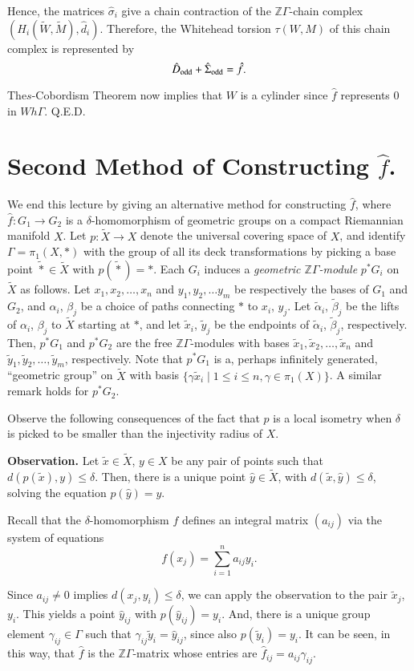 Hence, the matrices $\hat{\sigma}_i$ give a chain contraction of the
$\mathbb{Z} \Gamma$-chain complex $(H_i (\tilde{W}, \tilde{M}),
\hat{d}_i)$. Therefore, the Whitehead torsion $\tau (W, M)$ of this
chain complex is represented by 
$$
\hat{D}_{\operatorname{odd}} + \hat{\Sigma}_{\operatorname{odd}}= \hat{f}.
$$

The\pageoriginale $s$-Cobordism Theorem now implies that $W$ is a cylinder since
$\hat{f}$ represents 0 in $Wh \Gamma$. \hfill Q.E.D.

\setcounter{section}{2}
\section{Second Method of Constructing $\hat{f}$.}\label{c11:sec11.3}

We end this lecture by giving an alternative method for constructing
$\hat{f}$, where $\hat{f} : G_1 \to G_2$ is a $\delta$-homomorphism of
geometric groups on a compact Riemannian manifold $X$. Let $p:
\tilde{X} \to X$ denote the universal covering space of $X$, and
identify $\Gamma= \pi_1 (X, *)$ with the group of all its deck
transformations by picking a base point $\tilde{*} \in \tilde{X}$ with
$p (\tilde{*})= *$. Each $G_i$ induces a \textit{geometric $\mathbb{Z}
  \Gamma$-module} $p^* G_i$ on $\tilde{X}$ as follows. Let $x_1, x_2,
\ldots, x_n$ and $y_1, y_2, \ldots y_m$ be respectively the bases of
$G_1$ and $G_2$, and $\alpha_i$, $\beta_j$ be a choice of paths
connecting $*$ to $x_i$, $y_j$. Let $\tilde{\alpha}_i$,
$\tilde{\beta}_j$ be the lifts of $\alpha_i$, $\beta_j$ to $\tilde{X}$
starting at $*$, and let $\tilde{x}_i$, $\tilde{y}_j$ be the endpoints
of $\tilde{\alpha}_i$, $\tilde{\beta}_j$, respectively. Then, $p^*
G_1$ and $p^* G_2$ are the free $\mathbb{Z}\Gamma$-modules 
with bases $\tilde{x}_{1},\tilde{x}_{2},\ldots,\tilde{x}_{n}$ and
$\tilde{y}_{1},\tilde{y}_{2},\ldots,\tilde{y}_{m}$, respectively. Note
that $p^{*}G_{1}$ is a, perhaps 
infinitely
generated, ``geometric group'' on $\tilde{X}$ with basis $\{\gamma
\tilde{x}_i \mid 1 \leq i \leq n, \gamma \in \pi_1 (X)\}$. A similar
remark holds for $p^* G_2$.

Observe the following consequences of the fact that $p$ is a local
isometry when $\delta$ is picked to be smaller than the injectivity
radius of $X$.

\noindent\textbf{Observation. } Let $\tilde{x} \in \tilde{X}$, $y \in
X$ be any pair of points such that $d(p(\tilde{x}), y)\leq
\delta$. Then, there is a unique point $\hat{y} \in \tilde{X}$, with
$d(\tilde{x}, \hat{y}) \leq \delta$, solving the equation $p
(\hat{y})=y$.

Recall that the $\delta$-homomorphism $f$ defines an integral matrix
$(a_{ij})$ via the system of equations 
$$
f(x_j) = \sum_{i=1}^n a_{ij}y_i.
$$

Since $a_{ij} \neq 0$ implies $d(x_j, y_i)\leq \delta$, we can apply
the observation to the pair $\tilde{x}_j$, $y_i$. This yields a point
$\hat{y}_{ij}$ with $p(\hat{y}_{ij})= y_i$. And, there is a unique
group element $\gamma_{ij} \in \Gamma$ such that $\gamma_{ij}
\tilde{y}_{i}=\hat{y}_{ij}$, since also $p(\tilde{y}_i)= y_i$. It can be seen, in
this way, that $\hat{f}$ is the $\mathbb{Z}\Gamma$-matrix whose
entries are $\hat{f}_{ij}= a_{ij}\gamma_{ij}$.

